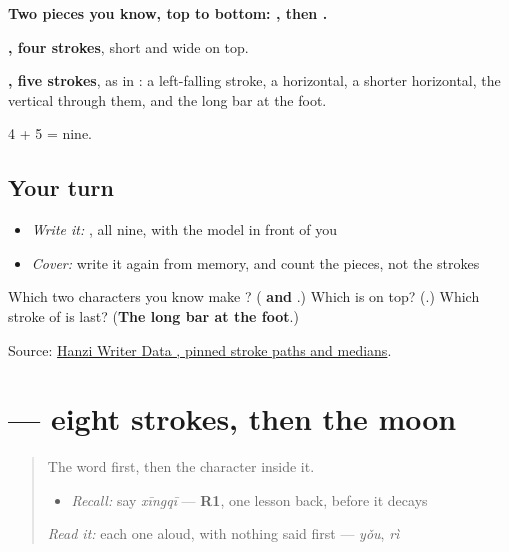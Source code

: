 \begin{quote}
\end{quote}

\textbf{Two pieces you know, top to bottom: , then .}

\textbf{, four strokes}, short and wide on top.

\textbf{, five strokes}, as in : a left-falling stroke, a horizontal, a shorter horizontal, the vertical through them, and the long bar at the foot.

4 + 5 = nine.

\subsection*{Your turn}
\begin{itemize}
\raggedright
  \item \emph{Write it:} , all nine, with the model in front of you
  \item \emph{Cover:} write it again from memory, and count the pieces, not the strokes
\end{itemize}

\begin{tcolorbox}[breakable,colback=teal!4,colframe=teal!35!black,title={Before you move on}]
Which two characters you know make ? (\textbf{ and }.) Which is on top? (\textbf{}.) Which stroke of  is last? (\textbf{The long bar at the foot}.)

Source: \href{https://raw.githubusercontent.com/chanind/hanzi-writer-data/68d10a4b21150cae5e1ebbd223eed289cf32d90c/data/\%E6\%98\%9F.json}{Hanzi Writer Data , pinned stroke paths and medians}.
\end{tcolorbox}
\section[\texorpdfstring{\zh{期} (qī)}{期 (qī)}]{ — eight strokes, then the moon}

\label{lesson:ZH-W46-qi-period}



\begin{quote}
The word first, then the character inside it.

\begin{itemize}
\raggedright
  \item \emph{Recall:} say \emph{xīngqī} — \textbf{R1}, one lesson back, before it decays
\end{itemize}

\begin{quote}
 
\end{quote}

\emph{Read it:} each one aloud, with nothing said first — \emph{yǒu}, \emph{rì}
\end{quote}

